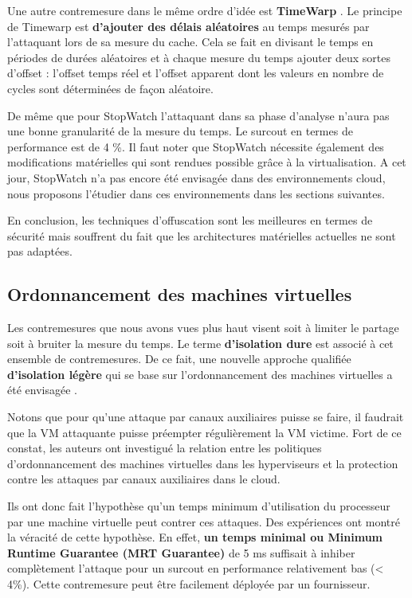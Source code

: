 Une autre contremesure dans le même ordre d’idée est \textbf{ TimeWarp} \cite{TimeWarp}. Le principe de Timewarp est \textbf{ d’ajouter des délais aléatoires}  au temps mesurés par l’attaquant lors de sa mesure du cache.  Cela se fait en divisant le temps en périodes de durées aléatoires et à chaque mesure du temps ajouter deux sortes d’offset : l’offset temps réel et l’offset apparent dont les valeurs en nombre de cycles sont déterminées de façon aléatoire.
\par  De même que pour StopWatch l’attaquant dans sa phase d’analyse n’aura pas une bonne granularité de la mesure du temps. Le surcout en termes de performance est de  4 \%. Il faut noter que StopWatch  nécessite également des modifications matérielles qui sont rendues possible grâce à la virtualisation. A cet jour, StopWatch n’a pas encore été envisagée dans des environnements cloud, nous proposons l’étudier dans ces environnements dans les sections suivantes.\newline         

En conclusion, les techniques d’offuscation sont les meilleures en termes de sécurité mais souffrent du fait que les architectures matérielles actuelles ne sont  pas  adaptées.

\subsection{Ordonnancement des machines virtuelles}
Les contremesures que nous avons vues plus haut visent soit à limiter le partage soit à bruiter la mesure du temps. Le terme \textbf{d’isolation dure} \cite{Ristenpart} est associé à cet ensemble de contremesures. De ce fait, une nouvelle approche qualifiée \textbf{d'isolation légère} qui se base sur l’ordonnancement des machines virtuelles a été envisagée \cite{Ristenpart}. \par 
Notons que pour qu’une attaque par canaux auxiliaires puisse se faire, il faudrait que la  VM attaquante puisse préempter régulièrement la VM victime. Fort de ce constat, les auteurs ont investigué la relation entre les politiques d’ordonnancement des machines virtuelles dans les hyperviseurs et la protection contre les attaques par canaux auxiliaires dans le cloud. \par Ils ont donc fait l’hypothèse qu’un temps minimum d’utilisation du processeur par une machine virtuelle peut contrer ces  attaques.  Des expériences ont montré la véracité de cette hypothèse. En effet, \textbf{ un temps minimal ou Minimum Runtime Guarantee (MRT Guarantee)} de 5 ms suffisait à inhiber complètement l’attaque  pour un surcout en performance relativement bas (< 4\%).  Cette contremesure peut être facilement déployée par un fournisseur. 

